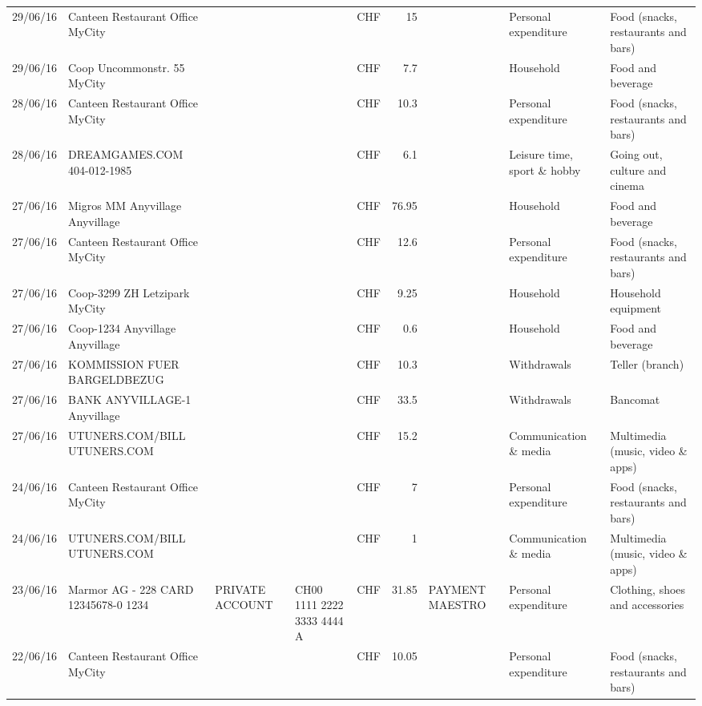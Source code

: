 \begin{landscape}
\begin{table}[h]
\begin{center}
\begin{tabular}{rllllrlll}
		29/06/16 & Canteen Restaurant Office      MyCity &       &       & CHF   & 15    &       & Personal expenditure & Food (snacks, restaurants and bars) \\
		29/06/16 & Coop Uncommonstr. 55   MyCity &       &       & CHF   & 7.7   &       & Household & Food and beverage \\
		28/06/16 & Canteen Restaurant Office      MyCity &       &       & CHF   & 10.3  &       & Personal expenditure & Food (snacks, restaurants and bars) \\
		28/06/16 & DREAMGAMES.COM           404-012-1985 &       &       & CHF   & 6.1   &       & Leisure time, sport \& hobby & Going out, culture and cinema \\
		27/06/16 & Migros MM Anyvillage    Anyvillage &       &       & CHF   & 76.95 &       & Household & Food and beverage \\
		27/06/16 & Canteen Restaurant Office      MyCity &       &       & CHF   & 12.6  &       & Personal expenditure & Food (snacks, restaurants and bars) \\
		27/06/16 & Coop-3299 ZH Letzipark   MyCity &       &       & CHF   & 9.25  &       & Household & Household equipment \\
		27/06/16 & Coop-1234 Anyvillage    Anyvillage &       &       & CHF   & 0.6   &       & Household & Food and beverage \\
		27/06/16 & KOMMISSION FUER BARGELDBEZUG &       &       & CHF   & 10.3  &       & Withdrawals & Teller (branch) \\
		27/06/16 & BANK ANYVILLAGE-1        Anyvillage &       &       & CHF   & 33.5  &       & Withdrawals & Bancomat \\
		27/06/16 & UTUNERS.COM/BILL          UTUNERS.COM &       &       & CHF   & 15.2  &       & Communication \& media & Multimedia (music, video \& apps) \\
		24/06/16 & Canteen Restaurant Office      MyCity &       &       & CHF   & 7     &       & Personal expenditure & Food (snacks, restaurants and bars) \\
		24/06/16 & UTUNERS.COM/BILL          UTUNERS.COM &       &       & CHF   & 1     &       & Communication \& media & Multimedia (music, video \& apps) \\
		23/06/16 & Marmor AG - 228 CARD 12345678-0 1234 & PRIVATE ACCOUNT & CH00 1111 2222 3333 4444 A & CHF   & 31.85 & PAYMENT MAESTRO & Personal expenditure & Clothing, shoes and accessories \\
		22/06/16 & Canteen Restaurant Office      MyCity &       &       & CHF   & 10.05 &       & Personal expenditure & Food (snacks, restaurants and bars) \\

\end{tabular}
\end{center}
\end{table}
\end{landscape}
